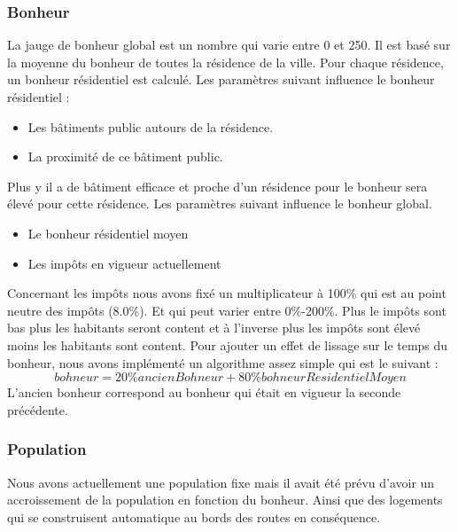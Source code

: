 \documentclass[a4paper,10pt,openany,oneside]{report}
\begin{document}
\subsubsection{Bonheur}
La jauge de bonheur global est un nombre qui varie entre 0 et 250. Il est basé sur la moyenne du bonheur de toutes la résidence de la ville. 
\newline
Pour chaque résidence, un bonheur résidentiel est calculé.
Les paramètres suivant influence le bonheur résidentiel :
\begin{itemize}
	\item Les bâtiments public autours de la résidence.
	\item La proximité de ce bâtiment public.
\end{itemize}
Plus y il a de bâtiment efficace et proche d'un résidence pour le bonheur sera élevé pour cette résidence.
Les paramètres suivant influence le bonheur global.
\begin{itemize}
	\item Le bonheur résidentiel moyen
	\item Les impôts en vigueur actuellement
\end{itemize}
Concernant les impôts nous avons fixé un multiplicateur à 100\% qui est au point neutre des impôts (8.0\%). Et qui peut varier entre 0\%-200\%. Plus le impôts sont bas plus les habitants seront content et à l'inverse plus les impôts sont élevé moins les habitants sont content.
\newline
Pour ajouter un effet de lissage sur le temps du bonheur, nous avons implémenté un algorithme assez simple qui est le suivant :
\[bohneur = 20\% ancienBohneur + 80\% bohneurResidentielMoyen\]
L'ancien bonheur correspond au bonheur qui était en vigueur la seconde précédente.

\subsubsection{Population}
Nous avons actuellement une population fixe mais il avait été prévu d'avoir un accroissement de la population en fonction du bonheur. Ainsi que des logements qui se construisent automatique au bords des routes en conséquence.
\end{document}
